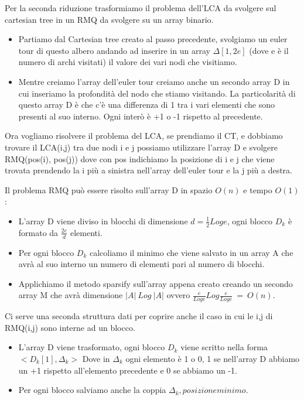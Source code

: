 \documentclass[14pt]{extreport}
\begin{document}
Per la seconda riduzione trasformiamo il problema dell'LCA da svolgere sul cartesian tree in un RMQ da svolgere su un array binario.
\begin{itemize}
\item Partiamo dal Cartesian tree creato al passo precedente, svolgiamo un euler tour di questo albero andando ad inserire in un array $\Delta[1,2e]$ (dove e è il numero di archi visitati) il valore dei vari nodi che visitiamo.
\item Mentre creiamo l'array dell'euler tour creiamo anche un secondo array D in cui inseriamo la profondità del nodo che stiamo visitando.
La particolarità di questo array D è che c'è una differenza di 1 tra i vari elementi che sono presenti al suo interno. Ogni interò è +1 o -1 rispetto al precedente.
\end{itemize}

Ora vogliamo risolvere il problema del LCA, se prendiamo il CT, e dobbiamo trovare il LCA(i,j) tra due nodi i e j possiamo utilizzare l'array D e svolgere RMQ(pos(i), pos(j)) dove con pos indichiamo la posizione di i e j che viene trovata prendendo la i più a sinistra nell'array dell'euler tour e la j più a destra.

Il problema RMQ può essere risolto sull'array D in spazio $O(n)$ e tempo $O(1)$:

\begin{itemize}
\item L'array D viene diviso in blocchi di dimensione $d=\frac{1}{2}Log e$, ogni blocco $D_k$ è formato da $\frac{2e}{d}$ elementi.
\item Per ogni blocco $D_k$ calcoliamo il minimo che viene salvato in un array A che avrà al suo interno un numero di elementi pari al numero di blocchi. 
\item Applichiamo il metodo sparsify sull'array appena creato creando un secondo array M che avrà dimensione $|A|\ Log\ |A|$ ovvero $\frac{e}{Loge}Log \frac{e}{Loge}\ =\ O(n)$.
\end{itemize}

Ci serve una seconda struttura dati per coprire anche il caso in cui le i,j di RMQ(i,j) sono interne ad un blocco.
\begin{itemize}
\item L'array D viene trasformato, ogni blocco $D_k$ viene scritto nella forma $<D_k[1], \Delta_k>$ Dove in $\Delta_k$ ogni elemento è 1 o 0, 1 se nell'array D abbiamo un +1 rispetto all'elemento precedente e 0 se abbiamo un -1.
\item Per ogni blocco salviamo anche la coppia $\Delta_k, posizione minimo$.
\end{itemize}
\end{document}
